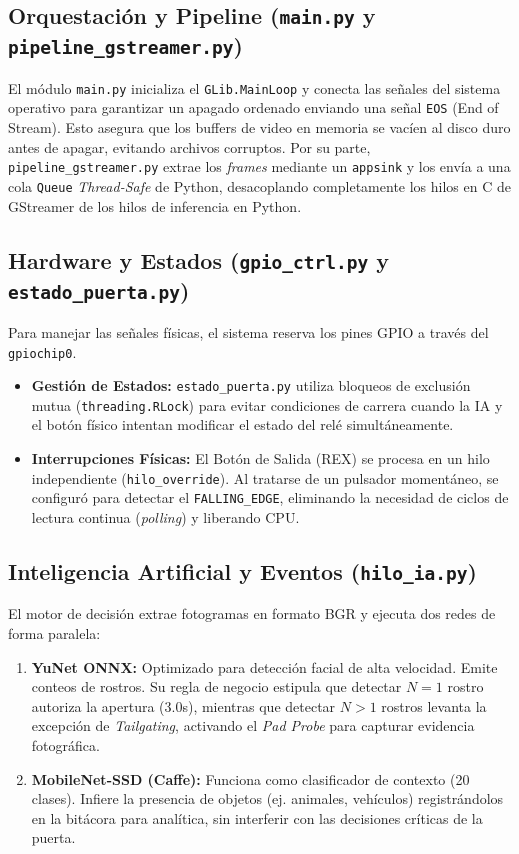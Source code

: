 \documentclass[11pt,a4paper]{article}
\begin{document}
\subsection{Orquestación y Pipeline (\texttt{main.py} y \texttt{pipeline\_gstreamer.py})}
El módulo \texttt{main.py} inicializa el \texttt{GLib.MainLoop} y conecta las señales del sistema operativo para garantizar un apagado ordenado enviando una señal \texttt{EOS} (End of Stream). Esto asegura que los buffers de video en memoria se vacíen al disco duro antes de apagar, evitando archivos corruptos. 
Por su parte, \texttt{pipeline\_gstreamer.py} extrae los \textit{frames} mediante un \texttt{appsink} y los envía a una cola \texttt{Queue} \textit{Thread-Safe} de Python, desacoplando completamente los hilos en C de GStreamer de los hilos de inferencia en Python.

\subsection{Hardware y Estados (\texttt{gpio\_ctrl.py} y \texttt{estado\_puerta.py})}
Para manejar las señales físicas, el sistema reserva los pines GPIO a través del \texttt{gpiochip0}. 
\begin{itemize}
    \item \textbf{Gestión de Estados:} \texttt{estado\_puerta.py} utiliza bloqueos de exclusión mutua (\texttt{threading.RLock}) para evitar condiciones de carrera cuando la IA y el botón físico intentan modificar el estado del relé simultáneamente.
    \item \textbf{Interrupciones Físicas:} El Botón de Salida (REX) se procesa en un hilo independiente (\texttt{hilo\_override}). Al tratarse de un pulsador momentáneo, se configuró para detectar el \texttt{FALLING\_EDGE}, eliminando la necesidad de ciclos de lectura continua (\textit{polling}) y liberando CPU.
\end{itemize}                

\subsection{Inteligencia Artificial y Eventos (\texttt{hilo\_ia.py})}
El motor de decisión extrae fotogramas en formato BGR y ejecuta dos redes de forma paralela:
\begin{enumerate}
\item \textbf{YuNet ONNX:} Optimizado para detección facial de alta velocidad. Emite conteos de rostros. Su regla de negocio estipula que detectar $N=1$ rostro autoriza la apertura (3.0s), mientras que detectar $N>1$ rostros levanta la excepción de \textit{Tailgating}, activando el \textit{Pad Probe} para capturar evidencia fotográfica.
\item \textbf{MobileNet-SSD (Caffe):} Funciona como clasificador de contexto (20 clases). Infiere la presencia de objetos (ej. animales, vehículos) registrándolos en la bitácora para analítica, sin interferir con las decisiones críticas de la puerta.
\end{enumerate}
\end{document}
